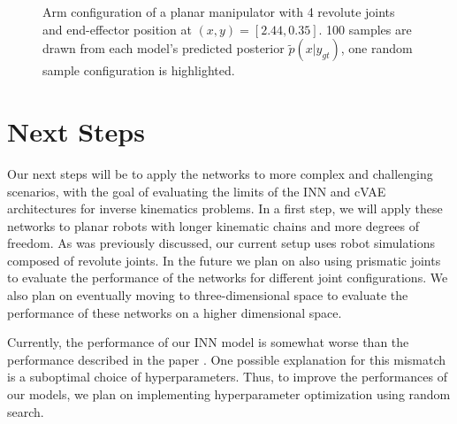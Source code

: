 \documentclass[conference]{IEEEtran}
\begin{document}
\begin{figure}[t]
    \centering

    \caption{\label{fig:posterior:4dof} Arm configuration of a planar manipulator with 4 revolute joints and end-effector position at $(x, y) = [2.44, 0.35]$. 100 samples are drawn from each model's predicted posterior $\tilde{p}(x | y_{gt})$, one random sample configuration is highlighted.}
\end{figure}


\section*{Next Steps}

Our next steps will be to apply the networks to more complex and challenging scenarios, with the goal of evaluating the limits of the INN and cVAE architectures for inverse kinematics problems. In a first step, we will apply these networks to planar robots with longer kinematic chains and more degrees of freedom. As was previously discussed, our current setup uses robot simulations composed of revolute joints. In the future we plan on also using prismatic joints to evaluate the performance of the networks for different joint configurations. We also plan on eventually moving to three-dimensional space to evaluate the performance of these networks on a higher dimensional space.

Currently, the performance of our INN model is somewhat worse than the performance described in the paper \cite{Ardizzone2018}. One possible explanation for this mismatch is a suboptimal choice of hyperparameters. Thus, to improve the performances of our models, we plan on implementing hyperparameter optimization using random search.

\nocite{*}


\end{document}
